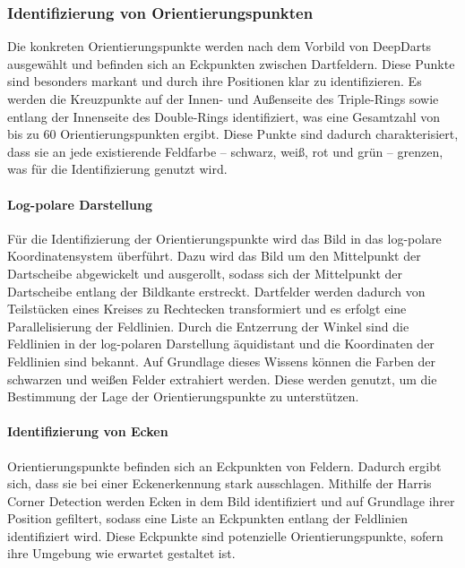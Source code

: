 \newpage
\subsubsection{Identifizierung von Orientierungspunkten}
\label{sec:orientierungspunkte_finden}

Die konkreten Orientierungspunkte werden nach dem Vorbild von DeepDarts ausgewählt und befinden sich an Eckpunkten zwischen Dartfeldern. Diese Punkte sind besonders markant und durch ihre Positionen klar zu identifizieren. Es werden die Kreuzpunkte auf der Innen- und Außenseite des Triple-Rings sowie entlang der Innenseite des Double-Rings identifiziert, was eine Gesamtzahl von bis zu 60 Orientierungspunkten ergibt. Diese Punkte sind dadurch charakterisiert, dass sie an jede existierende Feldfarbe -- schwarz, weiß, rot und grün -- grenzen, was für die Identifizierung genutzt wird.

\paragraph{Log-polare Darstellung}

Für die Identifizierung der Orientierungspunkte wird das Bild in das log-polare Koordinatensystem überführt. Dazu wird das Bild um den Mittelpunkt der Dartscheibe abgewickelt und ausgerollt, sodass sich der Mittelpunkt der Dartscheibe entlang der Bildkante erstreckt. Dartfelder werden dadurch von Teilstücken eines Kreises zu Rechtecken transformiert und es erfolgt eine Parallelisierung der Feldlinien. Durch die Entzerrung der Winkel sind die Feldlinien in der log-polaren Darstellung äquidistant und die Koordinaten der Feldlinien sind bekannt. Auf Grundlage dieses Wissens können die Farben der schwarzen und weißen Felder extrahiert werden. Diese werden genutzt, um die Bestimmung der Lage der Orientierungspunkte zu unterstützen.

\paragraph{Identifizierung von Ecken}

Orientierungspunkte befinden sich an Eckpunkten von Feldern. Dadurch ergibt sich, dass sie bei einer Eckenerkennung stark ausschlagen. Mithilfe der Harris Corner Detection werden Ecken in dem Bild identifiziert und auf Grundlage ihrer Position gefiltert, sodass eine Liste an Eckpunkten entlang der Feldlinien identifiziert wird. Diese Eckpunkte sind potenzielle Orientierungspunkte, sofern ihre Umgebung wie erwartet gestaltet ist.


